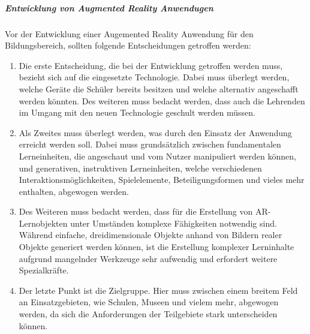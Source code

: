 \subparagraph{Entwicklung von Augmented Reality Anwendugen}
Vor der Entwicklung einer Augemented Reality Anwendung für den Bildungsbereich, sollten folgende Entscheidungen getroffen werden:
\begin{enumerate}
\item Die erste Entscheidung, die bei der Entwicklung getroffen werden muss, bezieht sich auf die eingesetzte Technologie. Dabei muss überlegt werden, welche Geräte die Schüler bereits besitzen und welche alternativ angeschafft werden könnten. Des weiteren muss bedacht werden, dass auch die Lehrenden im Umgang mit den neuen Technologie geschult werden müssen.
\item Als Zweites muss überlegt werden, was durch den Einsatz der Anwendung erreicht werden soll. Dabei muss grundsätzlich zwischen fundamentalen Lerneinheiten, die angeschaut und vom Nutzer manipuliert werden können, und generativen, instruktiven Lerneinheiten, welche verschiedenen Interaktionsmöglichkeiten, Spielelemente, Beteiligungsformen und vieles mehr enthalten,  abgewogen werden. 
\item Des Weiteren muss bedacht werden, dass für die Erstellung von AR-Lernobjekten unter Umständen komplexe Fähigkeiten notwendig sind. Während einfache, dreidimensionale Objekte anhand von Bildern realer Objekte generiert werden können, ist die Erstellung komplexer Lerninhalte aufgrund mangelnder Werkzeuge sehr aufwendig und erfordert weitere Spezialkräfte.
\item Der letzte Punkt ist die Zielgruppe. Hier muss zwischen einem breitem Feld an Einsatzgebieten, wie Schulen, Museen und vielem mehr, abgewogen werden, da sich die Anforderungen der Teilgebiete stark unterscheiden können. 
\end{enumerate}
\citep[Kapitel 1.7]{geroimenko:ar-in-education}

